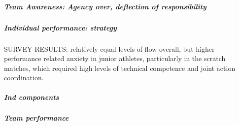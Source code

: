 
          \subparagraph{Team Awareness: Agency over, deflection of responsibility}

        \subparagraph{Individual performance: strategy}








      SURVEY RESULTS: relatively equal levels of flow overall, but higher performance related anxiety in junior athletes, particularly in the scratch matches, which required high levels of technical competence and joint action coordination.









          \subparagraph{Ind components}
        \subparagraph{Team performance}

